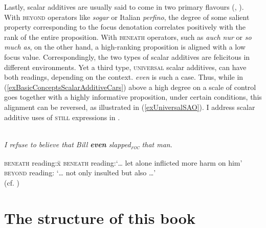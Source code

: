 Lastly, scalar additives are usually said to come in two primary flavours (\cite{GastvanderAuwera2011}, \citeyear{GastvanderAuwera2013}). With \textsc{beyond} operators like  \textit{sogar} or Italian \textit{perfino}, the degree of some salient property corresponding to the focus denotation correlates positively with the rank of the entire proposition. With \textsc{beneath} operators, such as  \textit{auch nur} or  \textit{so much as}, on the other hand, a high-ranking proposition is aligned with a low focus value. Correspondingly, the two types of scalar additives are felicitous in different environments. Yet a third type, \textsc{universal} scalar additives, can have both readings, depending on the context.  \textit{even} is such a case. Thus, while in (\ref{exBasicConceptsScalarAdditiveCars}) above a high degree on a scale of control goes together with a highly informative proposition, under certain conditions, this alignment can be reversed, as illustrated in (\ref{exUniversalSAO}). I address scalar additive uses of \textsc{still} expressions in .

\begin{exe}
	\ex {}\label{exUniversalSAO}\\
	\textit{I refuse to believe that Bill \textbf{even} slapped\textup{\textsubscript{\textsc{foc}}} that man}.
	\begin{tabbing}
	\textsc{beneath} reading:x\=\kill
	\textsc{beneath} reading:\>\lq … let alone inflicted more harm on him\rq{}\\
	\textsc{beyond} reading: \>\lq … not only insulted but also …\rq{}\\
	(cf. \cite{GastvanderAuwera2011})
	\end{tabbing}
\end{exe}

\section{The structure of this book}
\label{sectionStructureBook}
